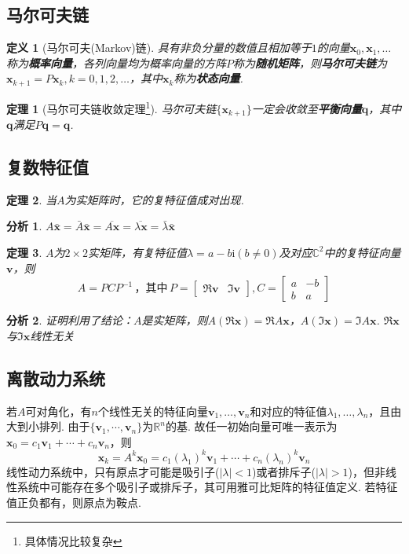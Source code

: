 \documentclass[11pt,UTF8]{ctexart}
\newtheorem{theorem}{定理}
\newtheorem{definition}{定义}
\newtheorem*{analysis}{分析}
\def\vx{\mathbf{x}}
\def\vv{\mathbf{v}}
\def\rn{\mathbb{R}^n}
\def\ii{\mathrm{i}}
\newcommand{\vb}[1]{\mathbf{#1}}
\begin{document}
\subsection{马尔可夫链}%
\begin{definition}[马尔可夫(Markov)链]
具有非负分量的数值且相加等于$1$的向量$\vx_0,\vx_1,\dots$称为\textbf{概率向量}，各列向量均为概率向量的方阵$P$称为\textbf{随机矩阵}，则\textbf{马尔可夫链}为$\vx_{k+1}=P\vx_{k},k=0,1,2,\dots$，其中$\vx_k$称为\textbf{状态向量}.
\end{definition}
\begin{theorem}[马尔可夫链收敛定理\protect\footnote{具体情况比较复杂}]
马尔可夫链$\{\vx_{k+1}\}$一定会收敛至\textbf{平衡向量}$\vb{q}$，其中$\vb{q}$满足$P\vb{q}=\vb{q}$.
\end{theorem}

\subsection{复数特征值}%
\begin{theorem}
当$A$为实矩阵时，它的复特征值成对出现.
\end{theorem}
\begin{analysis}
$A\bar{\vx}=\bar{A}\bar{\vx}=\overline{A\vx}=\overline{\lambda\vx}=\bar{\lambda}\bar{\vx}$
\end{analysis}
\begin{theorem}
$A$为$2\times 2$实矩阵，有复特征值$\lambda=a-b\ii(b\ne 0)$及对应$\mathbb{C}^2$中的复特征向量$\vv$，则
\[A=PCP^{-1}\,\text{，其中}\,P=\begin{bmatrix}\Re\vv&\Im\vv\end{bmatrix},C=\begin{bmatrix}a&-b\\b&a\end{bmatrix}\]
\end{theorem}
\begin{analysis}
证明利用了结论：$A$是实矩阵，则$A(\Re\vx)=\Re A\vx$，$A(\Im\vx)=\Im A\vx$. $\Re\vx$与$\Im\vx$线性无关
\end{analysis}

\subsection{离散动力系统}%
若$A$可对角化，有$n$个线性无关的特征向量$\vv_1,\dots,\vv_n$和对应的特征值$\lambda_1,\dots,\lambda_n$，且由大到小排列. 由于$\{\vv_1,\cdots,\vv_n\}$为$\rn$的基. 故任一初始向量可唯一表示为$\vx_0=c_1\vv_1+\cdots+c_n\vv_n$，则
\[\vx_k=A^k\vx_0=c_1(\lambda_1)^k\vv_1+\cdots+c_n(\lambda_n)^k\vv_n\]
线性动力系统中，只有原点才可能是吸引子($|\lambda|<1$)或者排斥子($|\lambda|>1$)，但非线性系统中可能存在多个吸引子或排斥子，其可用雅可比矩阵的特征值定义. 若特征值正负都有，则原点为鞍点.
\end{document}

